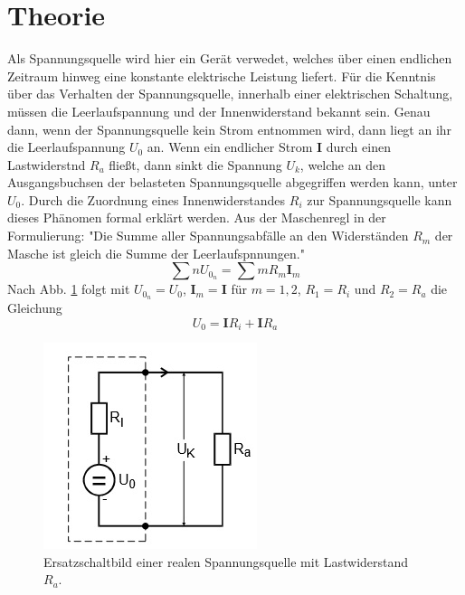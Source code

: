 \section{Theorie}
\label{sec:Theorie}
Als Spannungsquelle wird hier ein Gerät verwedet, welches über einen endlichen Zeitraum hinweg eine konstante elektrische Leistung liefert.
Für die Kenntnis über das Verhalten der Spannungsquelle, innerhalb einer elektrischen Schaltung, müssen die Leerlaufspannung und der Innenwiderstand bekannt sein.
Genau dann, wenn der Spannungsquelle kein Strom entnommen wird, dann liegt an ihr die Leerlaufspannung $U_0$ an.
Wenn ein endlicher Strom $\symbf{I}$ durch einen Lastwiderstnd $R_a$ fließt, dann sinkt die Spannung $U_k$, welche an den Ausgangsbuchsen der belasteten Spannungsquelle abgegriffen werden kann, unter $U_0$.
Durch die Zuordnung eines Innenwiderstandes $R_i$ zur Spannungsquelle kann dieses Phänomen formal erklärt werden.
Aus der Maschenregl in der Formulierung: "Die Summe aller Spannungsabfälle an den Widerständen $R_m$ der Masche ist gleich die Summe der Leerlaufspnnungen."
\begin{equation}
  \sum\limits{n} U_{0_n} = \sum\limits{m} R_m \symbf{I}_m
  \label{eqn:eq1}
\end{equation}
Nach Abb. \ref{fig:abb1} folgt mit $U_{0_n} = U_0$, $\symbf{I}_m = \symbf{I}$ für $m = 1, 2$, $R_1 = R_i$ und $R_2 = R_a$ die Gleichung
\begin{equation}
  U_0 = \symbf{I} R_i + \symbf{I} R_a
  \label{eqn:eq2}
\end{equation}
\begin{figure}
  \centering
  \includegraphics{data/abb1.jpg}
  \caption{Ersatzschaltbild einer realen Spannungsquelle mit Lastwiderstand $R_a$. \cite{V301}}
  \label{fig:abb1}
\end{figure}
\\

